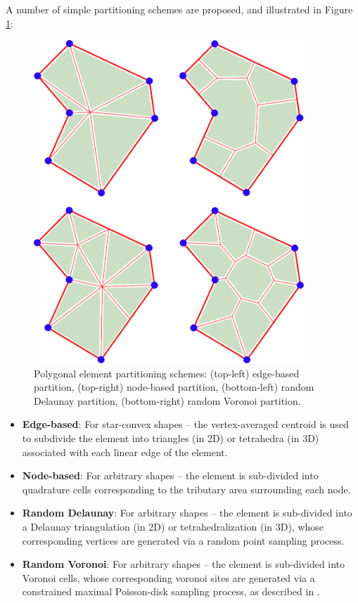 	A number of simple partitioning schemes are proposed, and illustrated in Figure \ref{fig:partitioning_types}:
	\begin{figure} [!ht]
		\centering
		\includegraphics[width = 4.0in]{figures/partition_types.pdf}
		\caption{Polygonal element partitioning schemes: (top-left) edge-based partition, (top-right) node-based partition, (bottom-left) random Delaunay partition, (bottom-right) random Voronoi partition.}
		\label{fig:partitioning_types}
	\end{figure}
	\begin{itemize}
		\item \textbf{Edge-based}: For star-convex shapes -- the vertex-averaged centroid is used to subdivide the element into triangles (in 2D) or tetrahedra (in 3D) associated with each linear edge of the element.
		\item \textbf{Node-based}: For arbitrary shapes -- the element is sub-divided into quadrature cells corresponding to the tributary area surrounding each node.
		\item \textbf{Random Delaunay}: For arbitrary shapes -- the element is sub-divided into a Delaunay triangulation (in 2D) or tetrahedralization (in 3D), whose corresponding vertices are generated via a random point sampling process.
		\item \textbf{Random Voronoi}: For arbitrary shapes -- the element is sub-divided into Voronoi cells, whose corresponding voronoi sites are generated via a constrained maximal Poisson-disk sampling process, as described in \cite{Ebeida:11}.
	\end{itemize}
	
